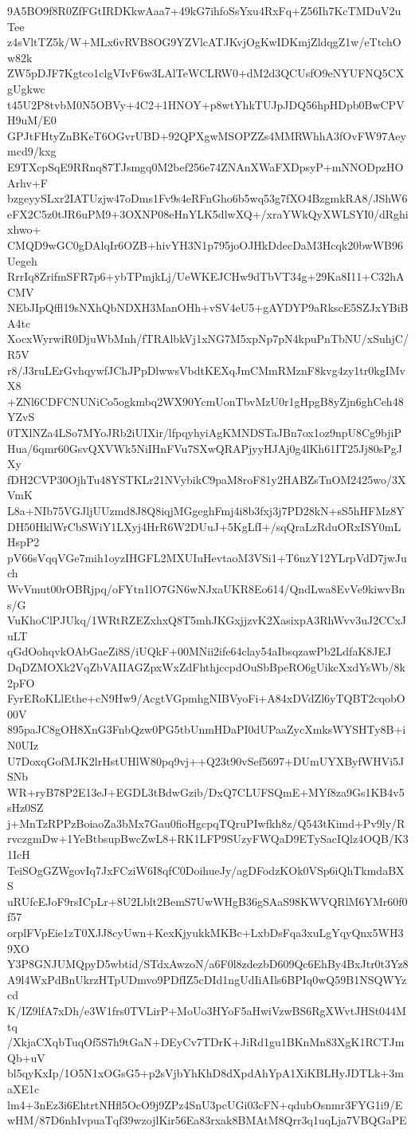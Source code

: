 9A5BO9f8R0ZfFGtIRDKkwAaa7+49kG7ihfoSsYxu4RxFq+Z56Ih7KcTMDuV2uTee
z4sVltTZ5k/W+MLx6vRVB8OG9YZVlcATJKvjOgKwIDKmjZldqgZ1w/eTtchOw82k
ZW5pDJF7Kgtco1clgVIvF6w3LAlTeWCLRW0+dM2d3QCUsfO9eNYUFNQ5CXgUgkwc
t45U2P8tvbM0N5OBVy+4C2+1HNOY+p8wtYhkTUJpJDQ56hpHDpb0BwCPVH9uM/E0
GPJtFHtyZnBKeT6OGvrUBD+92QPXgwMSOPZZs4MMRWhhA3fOvFW97Aeymcd9/kxg
E9TXcpSqE9RRnq87TJsmgq0M2bef256e74ZNAnXWaFXDpsyP+mNNODpzHOArhv+F
bzgeyySLxr2IATUzjw47oDms1Fv9s4eRFnGho6b5wq53g7fXO4BzgmkRA8/JShW6
eFX2C5z0tJR6uPM9+3OXNP08eHnYLK5dlwXQ+/xraYWkQyXWLSYI0/dRghixhwo+
CMQD9wGC0gDAlqIr6OZB+hivYH3N1p795joOJHkDdecDaM3Hcqk20bwWB96Uegeh
RrrIq8ZrifmSFR7p6+ybTPmjkLj/UeWKEJCHw9dTbVT34g+29Ka8I11+C32hACMV
NEbJIpQffl19sNXhQbNDXH3ManOHh+vSV4eU5+gAYDYP9aRkscE5SZJxYBiBA4tc
XocxWyrwiR0DjuWbMnh/fTRAlbkVj1xNG7M5xpNp7pN4kpuPnTbNU/xSuhjC/R5V
r8/J3ruLErGvhqywfJChJPpDlwwsVbdtKEXqJmCMmRMznF8kvg4zy1tr0kgIMvX8
+ZNl6CDFCNUNiCo5ogkmbq2WX90YcmUonTbvMzU0r1gHpgB8yZjn6ghCeh48YZvS
0TXlNZa4LSo7MYoJRb2iUIXir/lfpqyhyiAgKMNDSTaJBn7ox1oz9npU8Cg9bjiP
Hua/6qmr60GsvQXVWk5NiIHnFVu7SXwQRAPjyyHJAj0g4lKh61IT25Jj80sPgJXy
fDH2CVP30OjhTu48YSTKLr21NVybikC9paM8roF81y2HABZsTnOM2425wo/3XVmK
L8a+NIb75VGJljUUzmd8J8Q8iqjMGgeghFmj4i8b3fxj3j7PD28kN+sS5hHFMz8Y
DH50HklWrCbSWiY1LXyj4HrR6W2DUuJ+5KgLfI+/sqQraLzRduORxISY0mLHspP2
pV66sVqqVGe7mih1oyzIHGFL2MXUIuHevtaoM3VSi1+T6nzY12YLrpVdD7jwJuch
WvVmut00rOBRjpq/oFYtn1lO7GN6wNJxaUKR8Eo614/QndLwa8EvVe9kiwvBns/G
VuKhoClPJUkq/1WRtRZEZxhxQ8T5mhJKGxjjzvK2XasixpA3RhWvv3uJ2CCxJuLT
qGdOohqvkOAbGaeZi8S/iUQkF+00MNii2ife64clay54aIbsqzawPb2LdfaK8JEJ
DqDZMOXk2VqZbVAIIAGZpxWxZdFhthjccpdOuSbBpeRO6gUikcXxdYsWb/8k2pFO
FyrERoKLlEthe+cN9Hw9/AcgtVGpmhgNIBVyoFi+A84xDVdZl6yTQBT2cqobO00V
895paJC8gOH8XnG3FnbQzw0PG5tbUnmHDaPI0dUPaaZycXmksWYSHTy8B+iN0UIz
U7DoxqGofMJK2lrHstUHlW80pq9vj++Q23t90vSef5697+DUmUYXByfWHVi5JSNb
WR+ryB78P2E13eJ+EGDL3tBdwGzib/DxQ7CLUFSQmE+MYf8za9Gs1KB4v5sHz0SZ
j+MnTzRPPzBoiaoZa3bMx7Gau0fioHgcpqTQruPIwfkh8z/Q543tKimd+Pv9ly/R
rvczgmDw+1YeBtbsupBwcZwL8+RK1LFP9SUzyFWQaD9ETySacIQlz4OQB/K31IcH
TeiSOgGZWgovIq7JxFCziW6I8qfC0DoihueJy/agDFodzKOk0VSp6iQhTkmdaBXS
uRUfcEJoF9rsICpLr+8U2Lblt2BemS7UwWHgB36gSAaS98KWVQRlM6YMr60f0f57
orplFVpEie1zT0XJJ8cyUwn+KexKjyukkMKBc+LxbDsFqa3xuLgYqyQnx5WH39XO
Y3P8GNJUMQpyD5wbtid/STdxAwzoN/a6F0l8zdezbD609Qc6EhBy4BxJtr0t3Yz8
A9l4WxPdBnUkrzHTpUDmvo9PDfIZ5cDId1ngUdIiAIls6BPIq0wQ59B1NSQWYzcd
K/IZ9lfA7xDh/e3W1frs0TVLirP+MoUo3HYoF5aHwiVzwBS6RgXWvtJHSt044Mtq
/XkjaCXqbTuqOf5S7h9tGaN+DEyCv7TDrK+JiRd1gu1BKnMn83XgK1RCTJmQb+uV
bl5qyKxIp/1O5N1xOGsG5+p2sVjbYhKhD8dXpdAhYpA1XiKBLHyJDTLk+3maXE1c
lm4+3nEz3i6EhtrtNHfl5OcO9j9ZPz4SnU3pcUGi03cFN+qdubOsnmr3FYG1i9/E
wHM/87D6nhIvpuaTqf39wzojlKir56Ea83rxak8BMAtM8Qrr3q1uqLja7VBQGaPE
